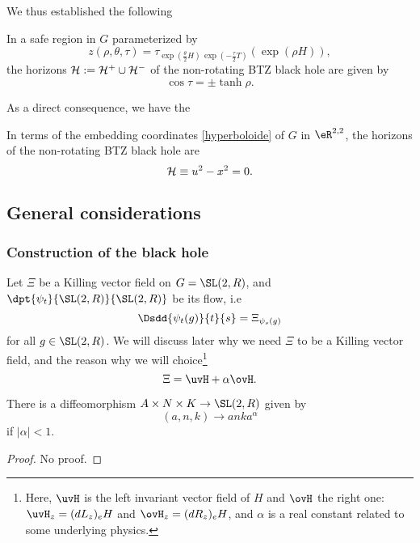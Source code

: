 We thus established the following
\begin{proposition}
In a safe region in $G$ parameterized by
\[
z(\rho,\theta,\tau) =\tau_{\exp(\frac{\theta}{2}H) \, \exp(-\frac{\tau}{2} T)}(\exp(\rho H)),
\]
 the horizons ${\cal H}:= {\cal H}^+ \cup {\cal H}^-$ of the non-rotating BTZ black hole are given by
\begin{equation}
 \cos \tau = \pm \tanh \rho.
 \end{equation}
\end{proposition}
As a direct consequence, we have the
\begin{corollary}		\label{CorHorClassLat}
In terms of the embedding coordinates \eqref{hyperboloide} of $G$ in
$\eR^{2,2}$, the horizons of the non-rotating BTZ black hole are
\begin{equation}
 {\cal H} \equiv u^2 - x^2 = 0.
 \end{equation}
 \end{corollary}

\subsection{General considerations}

\subsubsection{Construction of the black hole}

Let $\Xi$ be a Killing vector field on $G=\SL(2,R)$, and $\dpt{\psi_t}{\SL(2,R)}{\SL(2,R)}$ be its flow, i.e
\[
\Dsdd{\psi_t(g)}{t}{s}=\Xi_{\psi_s(g)}
\]
for all $g\in\SL(2,R)$. We will discuss later why we need $\Xi$ to be a Killing vector field, and the reason why we will choice\footnote{Here, $\uvH$ is the left invariant vector field of $H$ and $\ovH$ the right one: $\uvH_z=(dL_z)_eH$ and $\ovH_z=(dR_z)_eH$, and $\alpha$ is a real constant related to some underlying physics.}
\begin{equation}\label{eq:def_Xi}
\Xi=\uvH+\alpha\ovH.
\end{equation}

\begin{theorem}
There is a diffeomorphism $A\times N\times K\to \SL(2,R)$ given by
\[
 (a,n,k)\to anka^{\alpha}
\]
if $|\alpha|< 1$.
\end{theorem}
\begin{proof}
No proof.
\end{proof}

